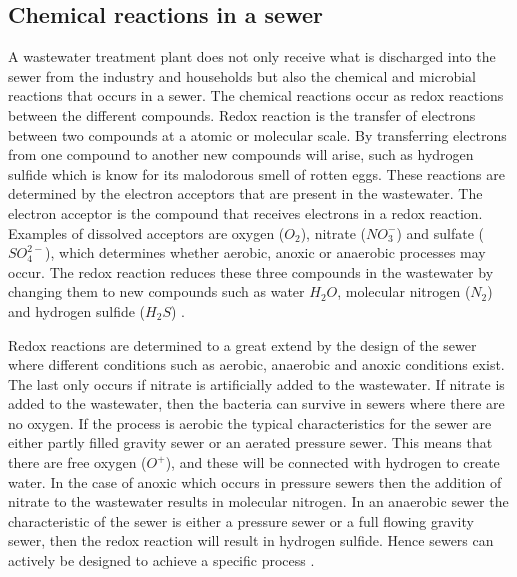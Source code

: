 \subsection{Chemical reactions in a sewer}\label{subse:chemical_reactions_in_a_sewer}
A wastewater treatment plant does not only receive what is discharged into the sewer from the industry and households but also the chemical and microbial reactions that occurs in a sewer. The chemical reactions occur as redox reactions between the different compounds. Redox reaction is the transfer of electrons between two compounds at a atomic or molecular scale. By transferring electrons from one compound to another new compounds will arise, such as hydrogen sulfide which is know for its malodorous smell of rotten eggs. These reactions are determined by the electron acceptors that are present in the wastewater. The electron acceptor is the compound that receives electrons in a redox reaction. Examples of dissolved acceptors are oxygen ($O_2$), nitrate ($NO^-_3$) and sulfate ($SO^{2-}_4$), which determines whether aerobic, anoxic or anaerobic processes may occur. The redox reaction reduces these three compounds in the wastewater by changing them to new compounds such as water $H_2O$, molecular nitrogen ($N_2$) and hydrogen sulfide ($H_2S$) \cite{Sewer_processes}. 

Redox reactions are determined to a great extend by the design of the sewer where different conditions such as aerobic, anaerobic and anoxic conditions exist. The last only occurs if nitrate is artificially added to the wastewater. If nitrate is added to the wastewater, then the bacteria can survive in sewers where there are no oxygen. If the process is aerobic the typical characteristics for the sewer are either partly filled gravity sewer or an aerated pressure sewer. This means that there are free oxygen ($O^+$), and these will be connected with hydrogen to create water. In the case of anoxic which occurs in pressure sewers then the addition of nitrate to the wastewater results in molecular nitrogen. In an anaerobic sewer the characteristic of the sewer is either a pressure sewer or a full flowing gravity sewer, then the redox reaction will result in hydrogen sulfide. Hence sewers can actively be designed to achieve a specific process \cite{Sewer_processes}. 

